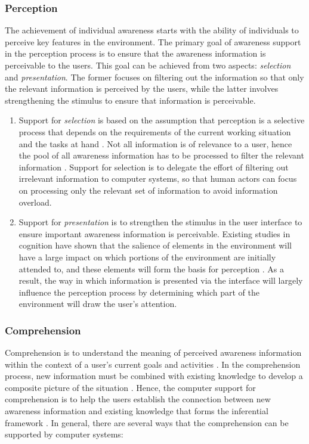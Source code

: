 \subsubsection*{Perception} %
\label{ssub:perception}
The achievement of individual awareness starts with the ability of individuals to perceive key features in the environment. The primary goal of awareness support in the perception process is to ensure that the awareness information is perceivable to the users. This goal can be achieved from two aspects: \emph{selection} and \emph{presentation}. The former focuses on filtering out the information so that only the relevant information is perceived by the users, while the latter involves strengthening the stimulus to ensure that information is perceivable.

\begin{enumerate}
	\item Support for \emph{selection} is based on the assumption that perception is a selective process that depends on the requirements of the current working situation and the tasks at hand \cite{Endsley1995}. Not all information is of relevance to a user, hence the pool of all awareness information has to be processed to filter the relevant information \cite{Berlage1999}. Support for selection is to delegate the effort of filtering out irrelevant information to computer systems, so that human actors can focus on processing only the relevant set of information to avoid information overload.
	\item Support for \emph{presentation} is to strengthen the stimulus in the user interface to ensure important awareness information is perceivable. Existing studies in cognition have shown that the salience of elements in the environment will have a large impact on which portions of the environment are initially attended to, and these elements will form the basis for perception \cite{Hegarty2011}. As a result, the way in which information is presented via the interface will largely influence the perception process by determining which part of the environment will draw the user's attention.
\end{enumerate}


\subsubsection*{Comprehension} %
\label{ssub:comprehension}
Comprehension is to understand the meaning of perceived awareness information within the context of a user's current goals and activities \cite{oulasvirta2007a}. In the comprehension process, new information must be combined with existing knowledge to develop a composite picture of the situation \cite{Endsley1995}. Hence, the computer support for comprehension is to help the users establish the connection between new awareness information and existing knowledge that forms the inferential framework \cite{carroll2003a}. In general, there are several ways that the comprehension can be supported by computer systems: 

